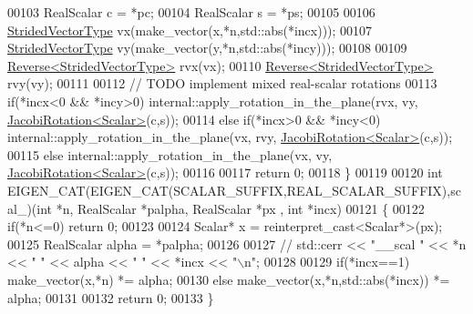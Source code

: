 \begin{DoxyCode}
00103   RealScalar c = *pc;
00104   RealScalar s = *ps;
00105 
00106   \hyperlink{group___core___module_class_eigen_1_1_map}{StridedVectorType} vx(make\_vector(x,*n,std::abs(*incx)));
00107   \hyperlink{group___core___module_class_eigen_1_1_map}{StridedVectorType} vy(make\_vector(y,*n,std::abs(*incy)));
00108 
00109   \hyperlink{group___core___module_class_eigen_1_1_reverse}{Reverse<StridedVectorType>} rvx(vx);
00110   \hyperlink{group___core___module_class_eigen_1_1_reverse}{Reverse<StridedVectorType>} rvy(vy);
00111 
00112   \textcolor{comment}{// TODO implement mixed real-scalar rotations}
00113        \textcolor{keywordflow}{if}(*incx<0 && *incy>0) internal::apply\_rotation\_in\_the\_plane(rvx, vy, 
      \hyperlink{group___jacobi___module_class_eigen_1_1_jacobi_rotation}{JacobiRotation<Scalar>}(c,s));
00114   \textcolor{keywordflow}{else} \textcolor{keywordflow}{if}(*incx>0 && *incy<0) internal::apply\_rotation\_in\_the\_plane(vx, rvy, 
      \hyperlink{group___jacobi___module_class_eigen_1_1_jacobi_rotation}{JacobiRotation<Scalar>}(c,s));
00115   \textcolor{keywordflow}{else}                        internal::apply\_rotation\_in\_the\_plane(vx, vy,  
      \hyperlink{group___jacobi___module_class_eigen_1_1_jacobi_rotation}{JacobiRotation<Scalar>}(c,s));
00116 
00117   \textcolor{keywordflow}{return} 0;
00118 \}
00119 
00120 \textcolor{keywordtype}{int} EIGEN\_CAT(EIGEN\_CAT(SCALAR\_SUFFIX,REAL\_SCALAR\_SUFFIX),scal\_)(\textcolor{keywordtype}{int} *n, RealScalar *palpha, RealScalar *px
      , \textcolor{keywordtype}{int} *incx)
00121 \{
00122   \textcolor{keywordflow}{if}(*n<=0) \textcolor{keywordflow}{return} 0;
00123 
00124   Scalar* x = \textcolor{keyword}{reinterpret\_cast<}Scalar*\textcolor{keyword}{>}(px);
00125   RealScalar alpha = *palpha;
00126 
00127 \textcolor{comment}{//   std::cerr << "\_\_scal " << *n << " " << alpha << " " << *incx << "\(\backslash\)n";}
00128 
00129   \textcolor{keywordflow}{if}(*incx==1)  make\_vector(x,*n) *= alpha;
00130   \textcolor{keywordflow}{else}          make\_vector(x,*n,std::abs(*incx)) *= alpha;
00131 
00132   \textcolor{keywordflow}{return} 0;
00133 \}
\end{DoxyCode}
